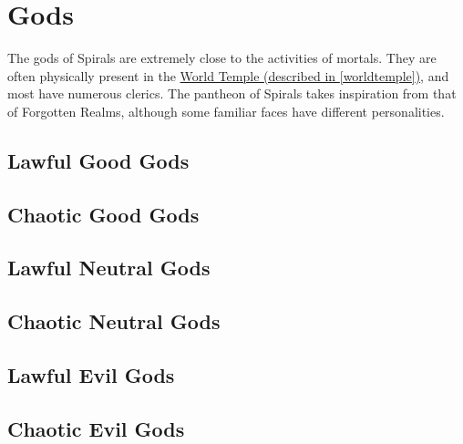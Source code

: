 \chapter{Gods}
The gods of Spirals are extremely close to the activities of mortals.
They are often physically present in the \hyperref[worldtemple]{World Temple (described in \autoref{worldtemple})}, and most have numerous clerics.
The pantheon of Spirals takes inspiration from that of Forgotten Realms, although some familiar faces have different personalities.


\begin{multicols}{2}

\section{Lawful Good Gods}


\section{Chaotic Good Gods}


\section{Lawful Neutral Gods}


\section{Chaotic Neutral Gods}


\section{Lawful Evil Gods}


\section{Chaotic Evil Gods}


\end{multicols}